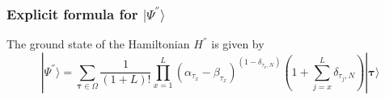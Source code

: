 \documentclass[10pt]{article}
\numberwithin{equation}{section}
\numberwithin{equation}{subsection}
\begin{document}
\subsubsection{Explicit formula for $|\Psi^{''}\rangle$}\label{subsectionSSHsec}
\begin{comment}
\textbf{Notation}: sometimes, in the following, we will denote differently the configuration of this hard-core chain. Each configuration can be written as
\begin{equation}\label{Tau-Notation}
	|\bm{\tau}\rangle=|\tau_{1},\ldots,\tau_{L}\rangle =\begin{pmatrix}
		\tau_{1}\\
		\vdots\\
		\tau_{L}
	\end{pmatrix}
\end{equation} 
with $\tau_{x}\in \{1,\ldots,N\}$, $\forall x\in \{1,\ldots,L\}$. The notation with $\bm{n}$, introduced in Subsection \ref{subsectionGeneratorStr} and the one with $\bm{\tau}$ are related by 
\begin{equation}
	n_{a}^{x}=\delta_{\tau_{x},a}
\end{equation}
\end{comment}
\begin{comment}

This notation is equivalent to the one introduced. Indeed, assume that at site $x$ we have a particle of type $a\in\{1,\ldots,N\} $, then $|n^{x}\rangle$ is composed by zeros but in the component $n_{a}^{x}$ where there is $1$. Therefore, we can uniquely associate  $\tau_{x}=a$ to this $|n^{x}\rangle$, denoting the presence of the species $a$ at site $x$. With this notation, we have that 
\begin{equation}\label{notation}
	|n^{x}\rangle =|\tau_{x}\rangle \qquad \text{and}\qquad|\bm{n}\rangle=|\bm{\tau}\rangle
\end{equation}
with the meaning explained above. It will be useful to introduce also $\bm{\tau}=(\tau_{x})_{x\in \{1,\ldots,L\}}$.
\end{comment} 
The ground state of the Hamiltonian $H^{''}$ is given by 
\begin{equation}\label{ResulsBasis}
	|\Psi^{''} \rangle= \sum_{\bm{\tau}\in \Omega}\frac{1}{\left(1+L\right)!}\prod_{x=1}^{L} (\alpha_{\tau_{x}}-\beta_{\tau_{x}})^{(1-\delta_{\tau_{x},N})}\left(1+\sum_{j=x}^{L}\delta_{\tau_{j},N}\right) |\bm{\tau}\rangle
\end{equation}
\end{document}
